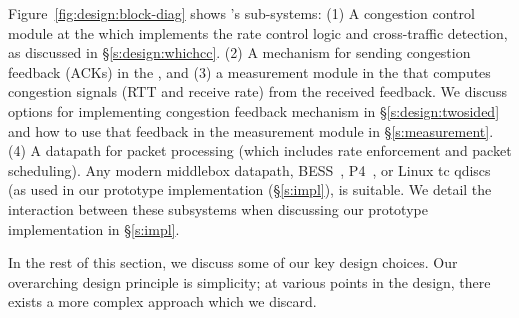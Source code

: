 Figure~\ref{fig:design:block-diag} shows \name's sub-systems: 
(1) A congestion control module at the \inbox which implements the rate control logic and cross-traffic detection, as discussed in \S\ref{s:design:whichcc}.
(2) A mechanism for sending congestion feedback (ACKs) in the \outbox, and (3) a measurement module in the \inbox that computes congestion signals (RTT and receive rate) from the received feedback. We discuss options for implementing congestion feedback mechanism in \S\ref{s:design:twosided} and how to use that feedback in the measurement module in \S\ref{s:measurement}.
(4) A datapath for packet processing (which includes rate enforcement and packet scheduling). Any modern middlebox datapath, \eg BESS~\cite{bess}, P4~\cite{p4}, or  Linux tc qdiscs (as used in our prototype implementation (\S\ref{s:impl}), is suitable.
We detail the interaction between these subsystems when discussing our prototype implementation in \S\ref{s:impl}. 
%

In the rest of this section, we discuss some of our key design choices.
Our overarching design principle is simplicity; at various points in the design, there exists a more complex approach which we discard.


